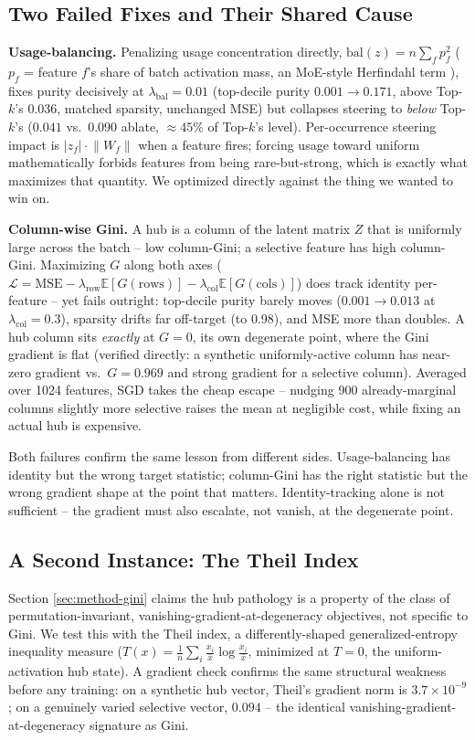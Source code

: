 \documentclass[11pt,twocolumn]{article}
\begin{document}
\subsection{Two Failed Fixes and Their Shared Cause}
\label{sec:failed-fixes}
\textbf{Usage-balancing.} Penalizing usage concentration directly, $\mathrm{bal}(z) = n\sum_f p_f^2$ ($p_f$ = feature $f$'s share of batch activation mass, an MoE-style Herfindahl term \citep{shazeer2017outrageously,fedus2022switch}), fixes purity decisively at $\lambda_{\mathrm{bal}}{=}0.01$ (top-decile purity $0.001\to0.171$, above Top-$k$'s $0.036$, matched sparsity, unchanged MSE) but collapses steering to \emph{below} Top-$k$'s ($0.041$ vs.\ $0.090$ ablate, $\approx45\%$ of Top-$k$'s level). Per-occurrence steering impact is $|z_f|\cdot\lVert W_f\rVert$ when a feature fires; forcing usage toward uniform mathematically forbids features from being rare-but-strong, which is exactly what maximizes that quantity. We optimized directly against the thing we wanted to win on.

\textbf{Column-wise Gini.} A hub is a column of the latent matrix $Z$ that is uniformly large across the batch -- low column-Gini; a selective feature has high column-Gini. Maximizing $G$ along both axes ($\mathcal{L} = \mathrm{MSE} - \lambda_{\mathrm{row}}\mathbb{E}[G(\mathrm{rows})] - \lambda_{\mathrm{col}}\mathbb{E}[G(\mathrm{cols})]$) does track identity per-feature -- yet fails outright: top-decile purity barely moves ($0.001\to0.013$ at $\lambda_{\mathrm{col}}{=}0.3$), sparsity drifts far off-target (to 0.98), and MSE more than doubles. A hub column sits \emph{exactly} at $G{=}0$, its own degenerate point, where the Gini gradient is flat (verified directly: a synthetic uniformly-active column has near-zero gradient vs.\ $G{=}0.969$ and strong gradient for a selective column). Averaged over 1024 features, SGD takes the cheap escape -- nudging 900 already-marginal columns slightly more selective raises the mean at negligible cost, while fixing an actual hub is expensive.

Both failures confirm the same lesson from different sides. Usage-balancing has identity but the wrong target statistic; column-Gini has the right statistic but the wrong gradient shape at the point that matters. Identity-tracking alone is not sufficient -- the gradient must also escalate, not vanish, at the degenerate point.

\subsection{A Second Instance: The Theil Index}
\label{sec:theil}
Section \ref{sec:method-gini} claims the hub pathology is a property of the class of permutation-invariant, vanishing-gradient-at-degeneracy objectives, not specific to Gini. We test this with the Theil index, a differently-shaped generalized-entropy inequality measure ($T(x) = \frac{1}{n}\sum_i \frac{x_i}{\bar x}\log\frac{x_i}{\bar x}$, minimized at $T{=}0$, the uniform-activation hub state). A gradient check confirms the same structural weakness before any training: on a synthetic hub vector, Theil's gradient norm is $3.7{\times}10^{-9}$; on a genuinely varied selective vector, $0.094$ -- the identical vanishing-gradient-at-degeneracy signature as Gini.
\end{document}
